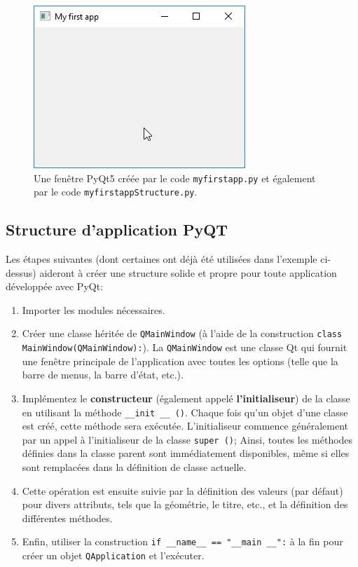 \documentclass[%
oneside,                 %
final,                   %
10pt,french]{article}
\begin{document}
\begin{figure}[!ht]  %
  \centerline{\includegraphics[width=0.7\linewidth]{imgs/myfirstapp.png}}
  \caption{
  Une fenêtre PyQt5 créée par le code \texttt{myfirstapp.py} et également par le code \texttt{myfirstappStructure.py}. \label{fig:myfirstapp}
  }
\end{figure}


\subsection{Structure d'application PyQT}

Les étapes suivantes (dont certaines ont déjà été utilisées dans l'exemple ci-dessus) aideront à créer une structure solide et propre pour toute application développée avec PyQt:

\begin{enumerate}
\item Importer les modules nécessaires.

\item Créer une classe héritée de \texttt{QMainWindow} (à l'aide de la construction \texttt{class MainWindow(QMainWindow):}). La \texttt{QMainWindow} est une classe Qt qui fournit une fenêtre principale de l’application avec toutes les options (telle que la barre de menus, la barre d’état, etc.).

\item Implémentez le \textbf{constructeur} (également appelé \textbf{l'initialiseur}) de la classe en utilisant la méthode \Verb!__init __ ()!. Chaque fois qu'un objet d'une classe est créé, cette méthode sera exécutée. L'initialiseur commence généralement par un appel à l'initialiseur de la classe \texttt{super ()}; Ainsi, toutes les méthodes définies dans la classe parent sont immédiatement disponibles, même si elles sont remplacées dans la définition de classe actuelle.

\item Cette opération est ensuite suivie par la définition des valeurs (par défaut) pour divers attributs, tels que la géométrie, le titre, etc., et la définition des différentes méthodes.

\item Enfin, utiliser la construction \Verb!if __name__ == "__main __":! à la fin pour créer un objet \texttt{QApplication} et l'exécuter.
\end{enumerate}
\end{document}

